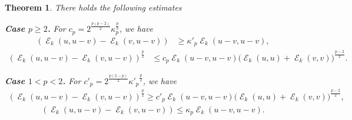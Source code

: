 \documentclass[12pt, reqno]{amsart}%
\theoremstyle{plain}  %
\newtheorem{theorem}{Theorem}[section]
\theoremstyle{definition}  %
\numberwithin{equation}{section}
\DeclareMathOperator{\cE}{\mathcal{E}}
\begin{document}
\begin{theorem}
\label{thm:under-upper-form-est}
There holds the following estimates

\medskip

\textbf{Case $p\geq 2$.} For $c_p= 2^{\frac{p(p-2)}{2}}\kappa_p^{\frac{p}{2}}$, we have
\begin{align}\label{eq:under-form-degen}
(\cE_k(u,u-v)-\cE_k(v,u-v)) &\geq \kappa'_p\cE_k(u-v,u-v),%
\end{align}
\begin{align}\label{eq:upper-form-degen}
(\cE_k(u,u-v)-\cE_k(v ,u-v) )^{\frac{p}{2}}&\leq c_p \cE_k(u-v,u-v)
\big(\cE_k(u,u)
+\cE_k(v,v)\big)^{\frac{p-2}{2}}.
\end{align}


\textbf{Case $1<p<2$.} For  $c'_p=2^{\frac{p(2-p)}{2}} {\kappa'_p}^{\frac{p}{2}} $, we have
\begin{align}\label{eq:under-form-sing}
(\cE_k(u,u-v)-\cE_k(v,u-v))^{\frac{p}{2}}
\geq c'_p \cE_k(u-v,u-v) \big( \cE_k(u,u)+\cE_k(v,v)\big)^{\frac{p-2}{2}} ,
\end{align}
\begin{align}\label{eq:upper-form-sing}
(\cE_k(u,u-v)-\cE_k(v,u-v))
\leq \kappa_p\cE_k(u-v,u-v).
\end{align}

\end{theorem}
\end{document}

